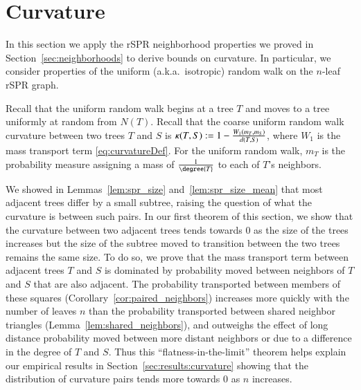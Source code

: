 \documentclass[]{elsarticle}
\newcommand{\curvature}[2][]{%
    \ifthenelse{\equal{#1}{}}%
		{\kappa(#2)}%
		{\kappa_{#1}(#2)}%
}
\begin{document}
\section{Curvature}
\label{sec:curvature}
In this section we apply the rSPR neighborhood properties we proved in Section~\ref{sec:neighborhoods} to derive bounds on curvature.
In particular, we consider properties of the uniform (a.k.a.\ isotropic) random walk on the $n$-leaf rSPR graph.

Recall that the uniform random walk begins at a tree $T$ and moves to a tree uniformly at random from $N(T)$.
Recall that the coarse uniform random walk curvature between two trees $T$ and $S$ is $\curvature{T, S} := 1 - \frac{W_1(m_T, m_S)}{d(T, S)}$, where $W_1$ is the mass transport term \eqref{eq:curvatureDef}.
For the uniform random walk, $m_T$ is the probability measure assigning a mass of $\frac{1}{\degree{T}}$ to each of $T$'s neighbors.

We showed in Lemmas~\ref{lem:spr_size} and~\ref{lem:spr_size_mean} that most adjacent trees differ by a small subtree, raising the question of what the curvature is between such pairs.
In our first theorem of this section, we show that the curvature between two adjacent trees tends towards 0 as the size of the trees increases but the size of the subtree moved to transition between the two trees remains the same size.
To do so, we prove that the mass transport term between adjacent trees $T$ and $S$ is dominated by probability moved between neighbors of $T$ and $S$ that are also adjacent.
The probability transported between members of these squares (Corollary~\ref{cor:paired_neighbors}) increases more quickly with the number of leaves $n$ than the probability transported between shared neighbor triangles (Lemma~\ref{lem:shared_neighbors}), and outweighs the effect of long distance probability moved between more distant neighbors or due to a difference in the degree of $T$ and $S$.
Thus this ``flatness-in-the-limit'' theorem helps explain our empirical results in Section~\ref{sec:results:curvature} showing that the distribution of curvature pairs tends more towards 0 as $n$ increases.
\end{document}
